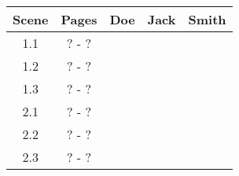 \begin{table}[H] %
\begin{tabular}{|c|c|c|c|c|}
\hline
Scene & Pages & Doe & Jack & Smith \\ \hline
  1.1 & ? - ? & \cellcolor{TableColorAppearance} &                                  & \cellcolor{TableColorAppearance} \\ \hline
  1.2 & ? - ? & \cellcolor{TableColorAppearance} &                                  & \cellcolor{TableColorAppearance} \\ \hline
  1.3 & ? - ? & \cellcolor{TableColorAppearance} & \cellcolor{TableColorAppearance} & \cellcolor{TableColorAppearance} \\ \hline
  2.1 & ? - ? & \cellcolor{TableColorAppearance} &                                  & \cellcolor{TableColorAppearance} \\ \hline
  2.2 & ? - ? & \cellcolor{TableColorAppearance} &                                  & \cellcolor{TableColorAppearance} \\ \hline
  2.3 & ? - ? & \cellcolor{TableColorAppearance} & \cellcolor{TableColorAppearance} & \cellcolor{TableColorAppearance} \\ \hline
\end{tabular}
\end{table}
